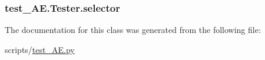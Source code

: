\subsubsection[{\texorpdfstring{selector}{selector}}]{\setlength{\rightskip}{0pt plus 5cm}test\+\_\+\+A\+E.\+Tester.\+selector}\hypertarget{classtest___a_e_1_1_tester_af5de85608be686569340cadad3fce67b}{}\label{classtest___a_e_1_1_tester_af5de85608be686569340cadad3fce67b}


The documentation for this class was generated from the following file\+:\begin{DoxyCompactItemize}
\item 
scripts/\hyperlink{test___a_e_8py}{test\+\_\+\+A\+E.\+py}\end{DoxyCompactItemize}
